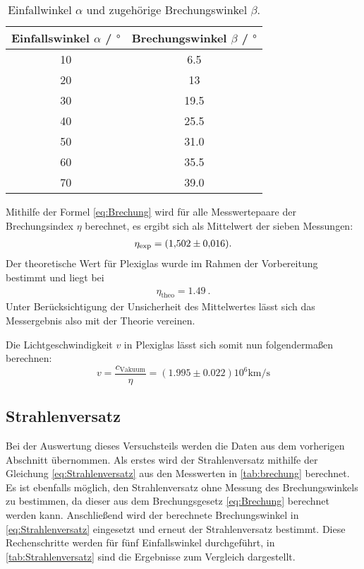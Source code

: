 \begin{table} [H]
    \centering
    \caption{Einfallwinkel $\alpha$ und zugehörige Brechungswinkel $\beta$.}
    \label{tab:brechung}
    \begin{tabular}{S S}
      \toprule
      {Einfallswinkel $\alpha$ / $\unit{\degree}$} & {Brechungswinkel $\beta$ / $\unit{\degree}$} \\
       & 6.5  \\
      20 & 13   \\
      30 & 19.5 \\
      40 & 25.5 \\
      50 & 31.0 \\
      60 & 35.5 \\
      70 & 39.0 \\
      \bottomrule
    \end{tabular}
\end{table}

Mithilfe der Formel \eqref{eq:Brechung} wird für alle Messwertepaare der Brechungsindex $\eta$ berechnet,
es ergibt sich als Mittelwert der sieben Messungen:
\begin{gather*}
    \eta_{\text{exp}}=\qty{1.502+-0.016}{}.
\end{gather*}
Der theoretische Wert für Plexiglas wurde im Rahmen der Vorbereitung bestimmt und liegt bei
\begin{gather*}
    \eta_{\text{theo}}=\qty{1.49}{}.
\end{gather*}
Unter Berücksichtigung der Unsicherheit des Mittelwertes lässt sich das Messergebnis also mit der Theorie vereinen.

Die Lichtgeschwindigkeit $v$ in Plexiglas lässt sich somit nun folgendermaßen berechnen:
\begin{equation*}
    v=\frac{c_{\text{Vakuum}}}{\eta}=(1.995\pm0.022)10^6\unit{\kilo\meter\per\second}
\end{equation*}

\subsection{Strahlenversatz}

Bei der Auswertung dieses Versuchsteils werden die Daten aus dem vorherigen Abschnitt übernommen.
Als erstes wird der Strahlenversatz mithilfe der Gleichung \eqref{eq:Strahlenversatz} aus den 
Messwerten in \autoref{tab:brechung} berechnet.
Es ist ebenfalls möglich, den Strahlenversatz ohne Messung des Brechungswinkels zu bestimmen, da dieser
aus dem Brechungsgesetz \eqref{eq:Brechung} berechnet werden kann.
Anschließend wird der berechnete Brechungswinkel in \eqref{eq:Strahlenversatz} eingesetzt und erneut
der Strahlenversatz bestimmt.
Diese Rechenschritte werden für fünf Einfallswinkel durchgeführt, in \autoref{tab:Strahlenversatz}
sind die Ergebnisse zum Vergleich dargestellt.

